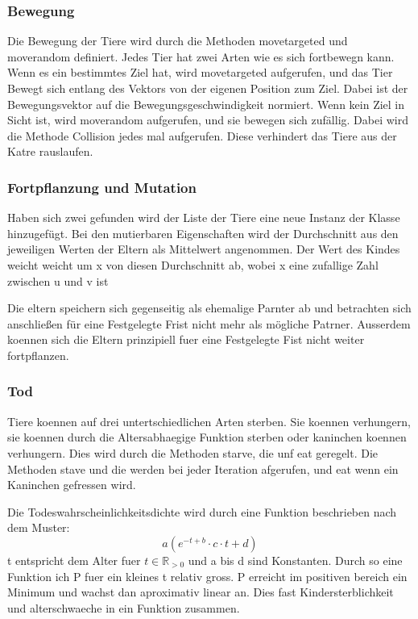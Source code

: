 \documentclass[12pt]{article}
\begin{document}
\subsubsection{Bewegung}
Die Bewegung der Tiere wird durch die Methoden movetargeted und moverandom definiert.
Jedes Tier hat zwei Arten wie es sich fortbewegn kann.
Wenn es ein bestimmtes Ziel hat, wird movetargeted aufgerufen, und das Tier Bewegt sich entlang des Vektors von der eigenen Position zum Ziel.
Dabei ist der Bewegungsvektor auf die Bewegungsgeschwindigkeit normiert.
Wenn kein Ziel in Sicht ist, wird moverandom aufgerufen, und sie bewegen sich zufällig.
Dabei wird die Methode Collision jedes mal aufgerufen.
Diese verhindert das Tiere aus der Katre rauslaufen.
\subsubsection{Fortpflanzung und Mutation}
Haben sich zwei gefunden wird der Liste der Tiere eine neue Instanz der Klasse hinzugefügt.
Bei den mutierbaren Eigenschaften wird der Durchschnitt aus den jeweiligen Werten der Eltern als Mittelwert angenommen.
Der Wert des Kindes weicht weicht um x von diesen Durchschnitt ab, wobei x eine zufallige Zahl zwischen u und v ist

Die eltern speichern sich gegenseitig als ehemalige Parnter ab und betrachten sich anschließen für eine Festgelegte Frist nicht mehr als mögliche Patrner. Ausserdem koennen sich die Eltern prinzipiell fuer eine Festgelegte Fist nicht weiter fortpflanzen.
\subsubsection{Tod}
Tiere koennen auf drei untertschiedlichen Arten sterben.
Sie koennen verhungern, sie koennen durch die Altersabhaegige Funktion sterben oder kaninchen koennen verhungern.
Dies wird durch die Methoden starve, die unf eat geregelt.
Die Methoden stave und die werden bei jeder Iteration afgerufen, und eat wenn ein Kaninchen gefressen wird.

Die Todeswahrscheinlichkeitsdichte wird durch eine Funktion beschrieben nach dem Muster:
\begin{equation}
    a ( {e}^{-t + b} \cdot c \cdot t + d)
\end{equation}
t entspricht dem Alter fuer $t \in \mathbb{R}_{>0}$  und a bis d sind Konstanten.
Durch so eine Funktion ich P fuer ein kleines t relativ gross.
P erreicht im positiven bereich ein Minimum und wachst dan aproximativ linear an.
Dies fast Kindersterblichkeit und alterschwaeche in ein Funktion zusammen.
\end{document}
